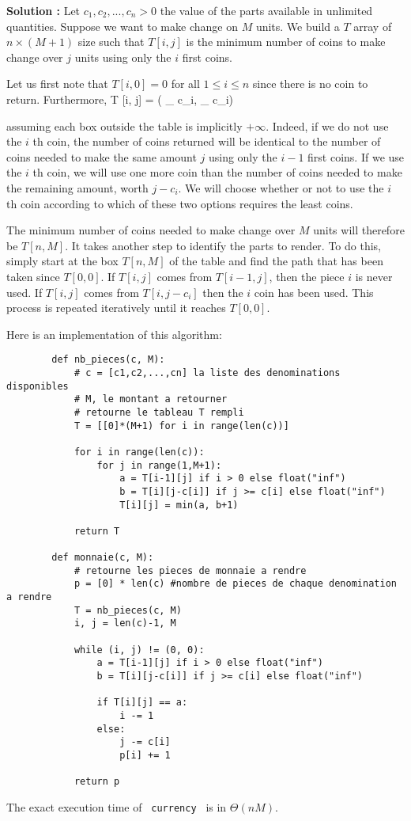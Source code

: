 \documentclass[11pt]{article} %
\newenvironment{solution}[1][\unskip]{%
	\par
	\noindent
	\textbf{Solution #1:}
	\noindent}
{\medskip}
\begin{document}
	\begin{solution}
		Let $ c_1, c_2, ..., c_n> 0 $ the value of the parts available in unlimited quantities. Suppose we want to make change on $ M $ units. We build a $ T $ array of $ n \times (M + 1) $ size such that $ T [i, j] $ is the minimum number of coins to make change over $ j $ units using only the $ i $ first coins.

		Let us first note that $ T [i, 0] = 0 $ for all $ 1 \leq i \leq n $ since there is no coin to return. Furthermore,
			T [i, j] = \min ( _ { c_i},  _ { c_i})

		assuming each box outside the table is implicitly $ + \infty $. Indeed, if we do not use the $ i $ th coin, the number of coins returned will be identical to the number of coins needed to make the same amount $ j $ using only the $ i-1 $ first coins. If we use the $ i $ th coin, we will use one more coin than the number of coins needed to make the remaining amount, worth $ j-c_i $. We will choose whether or not to use the $ i $ th coin according to which of these two options requires the least coins.

		The minimum number of coins needed to make change over $ M $ units will therefore be $ T [n, M] $. It takes another step to identify the parts to render. To do this, simply start at the box $ T [n, M] $ of the table and find the path that has been taken since $ T [0,0] $. If $ T [i, j] $ comes from $ T [i-1, j] $, then the piece $ i $ is never used. If $ T [i, j] $ comes from $ T [i, j-c_i] $ then the $ i $ coin has been used. This process is repeated iteratively until it reaches $ T [0,0] $.

		Here is an implementation of this algorithm:
		
		\newpage
		\begin{lstlisting}
		def nb_pieces(c, M):
			# c = [c1,c2,...,cn] la liste des denominations disponibles
			# M, le montant a retourner
			# retourne le tableau T rempli
			T = [[0]*(M+1) for i in range(len(c))]
			
			for i in range(len(c)):
				for j in range(1,M+1):
					a = T[i-1][j] if i > 0 else float("inf")
					b = T[i][j-c[i]] if j >= c[i] else float("inf")
					T[i][j] = min(a, b+1)
			
			return T
		
		def monnaie(c, M):
			# retourne les pieces de monnaie a rendre
			p = [0] * len(c) #nombre de pieces de chaque denomination a rendre
			T = nb_pieces(c, M)
			i, j = len(c)-1, M
			
			while (i, j) != (0, 0):
				a = T[i-1][j] if i > 0 else float("inf")
				b = T[i][j-c[i]] if j >= c[i] else float("inf")
				
				if T[i][j] == a:
					i -= 1
				else:
					j -= c[i]
					p[i] += 1
			
			return p
		\end{lstlisting}
		The exact execution time of \verb | currency | is in $ \Theta (nM) $.
	\end{solution}
	\newpage
\end{document}
